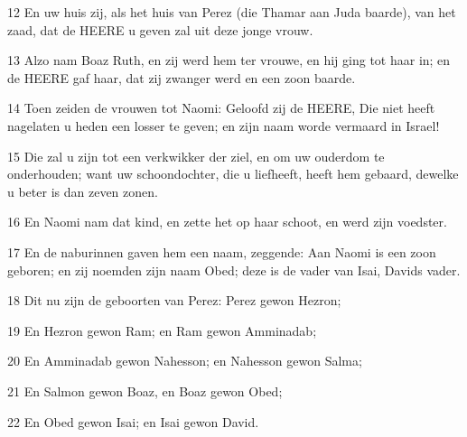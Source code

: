 \par 12 En uw huis zij, als het huis van Perez (die Thamar aan Juda baarde), van het zaad, dat de HEERE u geven zal uit deze jonge vrouw.
\par 13 Alzo nam Boaz Ruth, en zij werd hem ter vrouwe, en hij ging tot haar in; en de HEERE gaf haar, dat zij zwanger werd en een zoon baarde.
\par 14 Toen zeiden de vrouwen tot Naomi: Geloofd zij de HEERE, Die niet heeft nagelaten u heden een losser te geven; en zijn naam worde vermaard in Israel!
\par 15 Die zal u zijn tot een verkwikker der ziel, en om uw ouderdom te onderhouden; want uw schoondochter, die u liefheeft, heeft hem gebaard, dewelke u beter is dan zeven zonen.
\par 16 En Naomi nam dat kind, en zette het op haar schoot, en werd zijn voedster.
\par 17 En de naburinnen gaven hem een naam, zeggende: Aan Naomi is een zoon geboren; en zij noemden zijn naam Obed; deze is de vader van Isai, Davids vader.
\par 18 Dit nu zijn de geboorten van Perez: Perez gewon Hezron;
\par 19 En Hezron gewon Ram; en Ram gewon Amminadab;
\par 20 En Amminadab gewon Nahesson; en Nahesson gewon Salma;
\par 21 En Salmon gewon Boaz, en Boaz gewon Obed;
\par 22 En Obed gewon Isai; en Isai gewon David.




